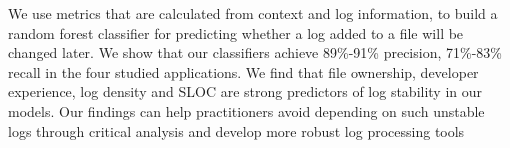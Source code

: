 We use metrics that are calculated from context and log information, to build a random forest classifier for predicting whether a log added to a file will be changed later. We show that our classifiers achieve 89\%-91\% precision, 71\%-83\% recall in the four studied applications. We find that file ownership, developer experience, log density and SLOC are strong predictors of log stability in our models. Our findings can help practitioners avoid depending on such unstable logs through critical analysis and develop more robust log processing tools





 
 
